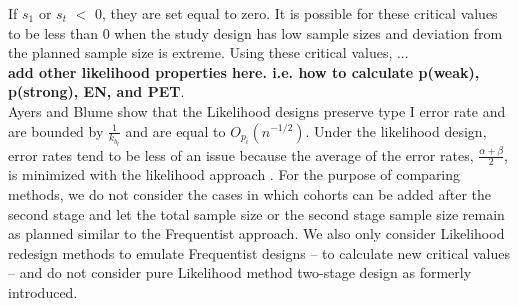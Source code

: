 \documentclass[12pt]{report}\usepackage[]{graphicx}\usepackage[]{color}
\newlength{\li}\setlength{\li}{14.48pt}
\begin{document}
If $s_1$ or $s_t$ $<$ 0, they are set equal to zero. It is possible for these critical values to be less than 0 when the study design has low sample sizes and deviation from the planned sample size is extreme. Using these critical values, ...\\
\textbf{add other likelihood properties here. i.e. how to calculate p(weak), p(strong), EN, and PET}. \\

\indent Ayers and Blume \cite{Ayers} show that the Likelihood designs preserve type I error rate and are bounded by $\frac{1}{k_{b_t}}$ and are equal to $O_{p_i}\left({n}^{-1/2}\right)$. Under the likelihood design, error rates tend to be less of an issue because the average of the error rates, $\frac{\alpha + \beta}{2}$, is minimized with the likelihood approach \cite{Ayers}. For the purpose of comparing methods, we do not consider the cases in which cohorts can be added after the second stage and let the total sample size or the second stage sample size remain as planned similar to the Frequentist approach. We also only consider Likelihood redesign methods to emulate Frequentist designs -- to calculate new critical values -- and do not consider pure Likelihood method two-stage design as formerly introduced. 
\end{document}
